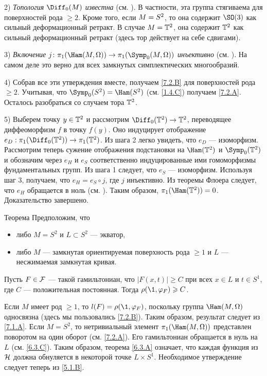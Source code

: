 2) \textit{Топология $\Diff_0 (M)$ известна} (см. \cite{EE}).
В частности, эта группа стягиваема для поверхностей рода $\ge 2$.
Кроме того, если $M \z= S^2$, то она содержит $\SO (3)$ как сильный
деформационный ретракт. 
В случае $M = \mathbb{T}^2$, она содержит $\mathbb{T}^2$ как сильный деформационный
ретракт (здесь тор действует на себе сдвигами). 

3) \textit{Включение $j\: \pi_1 (\Ham (M, \Omega)) \to \pi_1 (\Symp_0 (M,
\Omega))$ инъективно} (см. \cite[10.18 iii]{MS}). 
На самом деле это верно для всех замкнутых симплектических многообразий.

4) Собрав все эти утверждения вместе, получаем \ref{7.2.B} для
поверхностей рода $\ge 2$. 
Учитывая, что $\Symp_0 (S^2) = \Ham (S^2)$ (см. \ref{1.4.C}) получаем
\ref{7.2.A}. 
Осталось разобраться со случаем тора $\mathbb{T}^2$.

5) Выберем точку $y \in \mathbb{T}^2$ и рассмотрим  $\Diff_0 (\TT^2) \to \TT^2$,
переводящее диффеоморфизм $f$ в точку $f(y)$. 
Оно индуцирует отображение $e_D: \pi_1 (\Diff_0 (\TT^2)) \to \pi_1 (\TT^2)$.
Из шага 2 легко увидеть, что $e_D$ — изоморфизм.
Рассмотрим теперь сужение отображения подстановки на $\Ham (\TT^2)$ и
$\Symp_0 (\TT^2)$ и обозначим через $e_H$ и $e_S$ соответственно
индуцированные ими гомоморфизмы фундаментальных групп. 
Из шага 1 следует, что $e_S$ — изоморфизм.
Используя шаг 3, получаем, что $e_H = e_S \circ j$, где $j$ инъективно.
Из теоремы Флоера следует, что $e_H$ обращается в ноль (см. \cite{LMP1}).
Таким образом, $\pi_1 (\Ham (\TT^2)) = 0$. 
Доказательство завершено. 
\qeds

\begin{thm}[(\cite{P5})]{Теорема}\label{7.2.C}
Предположим, что 
\begin{itemize}
\item либо $M = S^2$ и $L \subset S^2$ — экватор, 
\item либо $M$ — замкнутая ориентируемая поверхность рода $\ge 1$ и $L$ — несжимаемая замкнутая кривая.
\end{itemize}
Пусть $F \in \mathcal{F}$ — такой гамильтониан, что $|F(x,t)| \ge C$ при всех $x \in L$ и $t \in S^1$, где $C$ — положительная постоянная.
Тогда $\rho (\1, \phi_F) \z\ge C$.
\end{thm}

Если $M$ имеет род $\ge 1$, то $l (F) = \rho (\1, \phi_F)$, поскольку группа $\Ham (M, \Omega)$ односвязна (здесь мы пользовались \ref{7.2.B}).
Таким образом, результат следует из \ref{7.1.A}.
Если $M = S^2$, то нетривиальный элемент $\pi_1 (\Ham (M, \Omega))$ представлен поворотом на один оборот (см. \ref{7.2.A}).
Его гамильтониан обращается в нуль на $L$ (см. \ref{6.3.C}).
Таким образом, теорема \ref{6.3.A} означает, что каждая функция из $\mathcal{H}$ должна обнуляется в некоторой точке $L \times S^1$.
Необходимое утверждение следует теперь из \ref{5.1.B}.
\qeds


